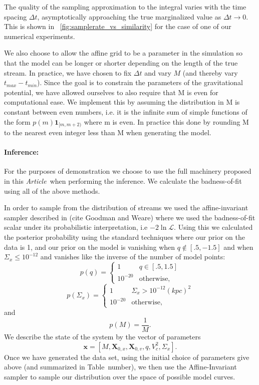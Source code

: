 \documentclass[12pt,preprint]{aastex}
\newcommand{\mtensor}[1]{\boldsymbol{#1}}
\newcommand{\mvector}[1]{\mtensor{#1}}
\newcommand{\vx}{\mvector{x}}
\newcommand{\vX}{\mvector{X}}
\newcommand{\like}{\mathscr{L}}
\newcommand{\documentname}{\textsl{Article}}
\begin{document}
The quality of the sampling approximation to the integral varies with
the time spacing $\Delta t$, asymptotically approaching the true
marginalized value as $\Delta t\rightarrow 0$.  This is shown in
\figurename~\ref{fig:samplerate_vs_similarity} for the case of one of our
numerical experiments. 

We also choose to allow the affine grid to be a parameter in the simulation so
that the model can be longer or shorter depending on the length of the true
stream. In practice, we have chosen to fix $\Delta t$ and vary $M$ (and thereby
vary $t_{max} - t_{min}$).  Since the goal is to constrain the parameters of the gravitational potential, we 
have allowed ourselves to also require that M is even for computational ease. We implement this by 
assuming the distribution in M is constant between even numbers, i.e. it is the infinite sum of simple 
functions of the form $p(m)\mathbf{1}_{[m,m+2)}$ where m is even. In practice this done by rounding M 
to the nearest even integer less than M when generating the model. 

\paragraph{Inference:}

For the purposes of demonstration we choose to use the full machinery proposed
in this \documentname~when performing the inference. We calculate the
badness-of-fit using all of the above methods.

In order to sample from the distribution of streams we used the affine-invariant sampler described in (cite 
Goodman and Weare) where we used the badness-of-fit scalar under its 
probabilistic interpretation, i.e $-2\ln\like$. Using this we calculated the
posterior probability using the standard techniques where our prior on the data
is 1, and our prior on the model is vanishing when $q \notin [.5,-1.5]$ and when $\Sigma_x \leq 10^{-12}$ 
and vanishes like the inverse of the number of model points:
\begin{equation}\displaystyle
p(q) = \left\{ \begin{array}{cl}  1 & q \in [.5,1.5] \\
				 10^{-20} & \text{otherwise,} 
\end{array}
\right.
\end{equation}
\begin{equation}\displaystyle
p(\Sigma_x) = \left\{ \begin{array}{cl} 1 & \Sigma_x > 10^{-12} (kpc)^2 \\
							10^{-20} &\text{otherwise,}
\end{array}
\right.
\end{equation}
and
\begin{equation}\displaystyle
p(M) = \frac{1}{M}.
\end{equation}
We describe the state of the system by the vector of parameters 
\[
\vx = [ M, \vX_{0,x}, \vX_{0,v}, q, V_c^2, \Sigma_x]. 
\] 
Once we have generated the data set, using the initial choice of
parameters give above (and summarized in Table~number), we then use
the Affine-Invariant sampler to sample our distribution over the space
of possible model curves. 
\end{document}
